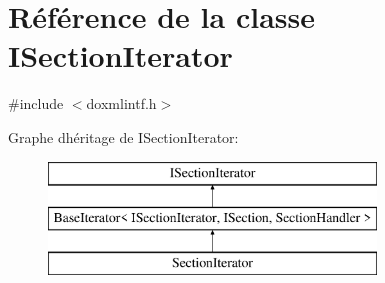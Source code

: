 \hypertarget{class_i_section_iterator}{}\section{Référence de la classe I\+Section\+Iterator}
\label{class_i_section_iterator}


{\ttfamily \#include $<$doxmlintf.\+h$>$}

Graphe d\textquotesingle{}héritage de I\+Section\+Iterator\+:\begin{figure}[H]
\begin{center}
\leavevmode
\includegraphics[height=3.000000cm]{class_i_section_iterator}
\end{center}
\end{figure}
